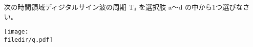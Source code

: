 次の時間領域ディジタルサイン波の周期 $\textrm{T}_d$ を選択肢 a〜d の中から1つ選びなさい。

\centering\texttt{[image: \\filedir/q.pdf]}
